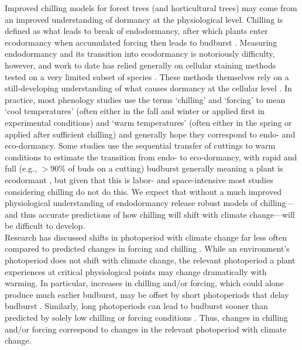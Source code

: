 \documentclass[11pt,letter]{article}
\begin{document}
Improved chilling models for forest trees (and horticultural trees) may come from an improved understanding of dormancy at the physiological level. Chilling is defined as what leads to break of endodormancy, after which plants enter ecodormancy when accumulated forcing then leads to budburst \citep{chuine2016}. Measuring endodormancy and its transition into ecodormancy is notoriously difficulty, however, and work to date has relied generally on cellular staining methods tested on a very limited subset of species \citep{rinne2011}. These methods themselves rely on a still-developing understanding of what causes dormancy at the cellular level \citep{vanderschoot2014}. In practice, most phenology studies use the terms `chilling' and `forcing' to mean `cool temperatures' (often either in the fall and winter or applied first in experimental conditions) and `warm temperatures' (often either in the spring or applied after sufficient chilling) and generally hope they correspond to endo- and eco-dormancy. Some studies use the sequential transfer of cuttings to warm conditions to estimate the transition from endo- to eco-dormancy, with rapid and full (e.g., $>$90\% of buds on a cutting) budburst generally meaning a plant is ecodormant \citep[e.g.,][]{Junttila:2012aa}, but given that this is labor- and space-intensive most studies considering chilling do not do this. We expect that without a much improved physiological understanding of endodormancy release robust models of chilling---and thus accurate predictions of how chilling will shift with climate change---will be difficult to develop. \\ %

Research has discussed shifts in photoperiod with climate change far less often compared to predicted changes in forcing and chilling \citep[but see][]{saikkonen2012,way2015}. While an environment's photoperiod does not shift with climate change, the relevant photoperiod a plant experiences at critical physiological points may change dramatically with warming. In particular, increases in chilling and/or forcing, which could alone produce much earlier budburst, may be offset by short photoperiods that delay budburst \citep{gauzere2019}. Similarly, long photoperiods can lead to budburst sooner than predicted by solely low chilling or forcing conditions \citep{Nienstaedt:1966aa,Myking:1995,Partanen:1998aa}. Thus, changes in chilling and/or forcing correspond to changes in the relevant photoperiod with climate change. \\
\end{document}
